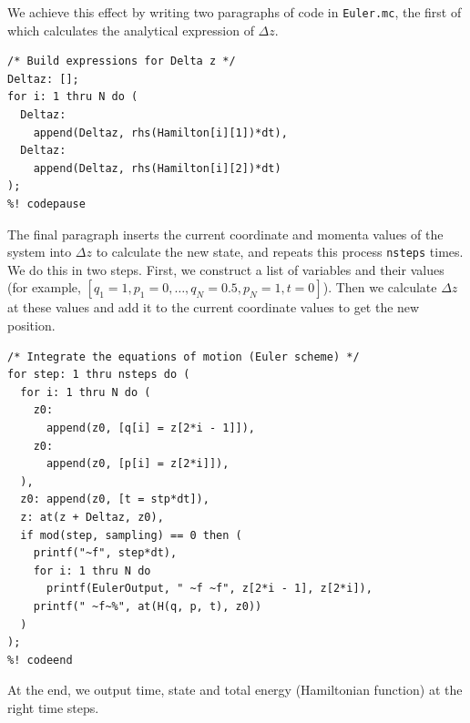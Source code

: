 \documentclass{article}
\begin{document}
We achieve this effect by writing two paragraphs of code in \texttt{Euler.mc},
the first of which calculates the analytical expression of $\Delta z$.
\begin{lstlisting}[frame=single]
%! codefile: Euler.mc
/* Build expressions for Delta z */
Deltaz: [];
for i: 1 thru N do (
  Deltaz:
    append(Deltaz, rhs(Hamilton[i][1])*dt),
  Deltaz:
    append(Deltaz, rhs(Hamilton[i][2])*dt)
);
%! codepause
\end{lstlisting}
The final paragraph inserts the current coordinate and momenta values of the 
system into $\Delta z$ to calculate the new state, and repeats this process 
\texttt{nsteps} times. We do this in two steps. First, we construct a list of 
variables and their values (for example, $[q_1 = 1, p_1 = 0, \ldots, q_N = 0.5, 
p_N = 1, t = 0]$). Then we calculate $\Delta z$ at these values and add it to 
the current coordinate values to get the new position.
\begin{lstlisting}[frame=single]
%! codecontinue: Euler.mc
/* Integrate the equations of motion (Euler scheme) */
for step: 1 thru nsteps do (
  for i: 1 thru N do (
    z0:
      append(z0, [q[i] = z[2*i - 1]]),
    z0:
      append(z0, [p[i] = z[2*i]]),
  ),
  z0: append(z0, [t = stp*dt]),
  z: at(z + Deltaz, z0),
  if mod(step, sampling) == 0 then (
    printf("~f", step*dt),
    for i: 1 thru N do
      printf(EulerOutput, " ~f ~f", z[2*i - 1], z[2*i]),
    printf(" ~f~%", at(H(q, p, t), z0))
  )
);
%! codeend
\end{lstlisting}
At the end, we output time, state and total energy (Hamiltonian function) at the 
right time steps.
\end{document}
